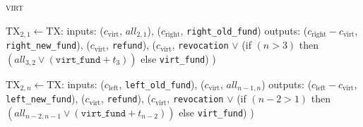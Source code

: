 \begin{center}
\begin{processbox}{\textsc{virt}}
\begin{algorithmic}[1]
          \State $\mathrm{TX}_{2, 1} \gets \mathrm{TX}$:
          \Indent
            \State inputs:
            \Indent
              \State ($c_{\mathrm{virt}}$, $\mathit{all}_{2, 1}$),
              \label{code:virtual-layer:mid-txs:i-is-2:extend-interval-left:virt}
              \State ($c_{\mathrm{right}}$, \texttt{right\_old\_fund})
            \EndIndent
            \State outputs:
            \Indent
              \State ($c_{\mathrm{right}} - c_{\mathrm{virt}}$,
              \texttt{right\_new\_fund}),
              \State ($c_{\mathrm{virt}}$, \texttt{refund}),
              \State ($c_{\mathrm{virt}}$,
              \Indent
                \State \texttt{revocation} $\vee$
                \State (if $(n > 3)$ then $(\mathit{all}_{3, 2}
                \vee (\texttt{virt\_fund} + t_3))$
                \State else \texttt{virt\_fund})
              \EndIndent
              \State )
            \EndIndent
          \EndIndent
        \EndIf

          \State $\mathrm{TX}_{2, n} \gets \mathrm{TX}$:
          \Indent
            \State inputs:
            \Indent
              \State ($c_{\mathrm{left}}$, \texttt{left\_old\_fund}),
              \State ($c_{\mathrm{virt}}$, $\mathit{all}_{n-1, n}$)
            \EndIndent
            \State outputs:
            \Indent
              \State ($c_{\mathrm{left}} - c_{\mathrm{virt}}$,
              \texttt{left\_new\_fund}),
              \State ($c_{\mathrm{virt}}$, \texttt{refund}),
              \State ($c_{\mathrm{virt}}$,
              \Indent
                \State \texttt{revocation} $\vee$
                \State (if $(n-2 > 1)$ then $(\mathit{all}_{n-2, n-1} \vee
                (\texttt{virt\_fund} + t_{n-2}))$
                \State else \texttt{virt\_fund})
              \EndIndent
              \State )
            \EndIndent
          \EndIndent
        \EndIf


\end{algorithmic}
\end{processbox}
\end{center}
